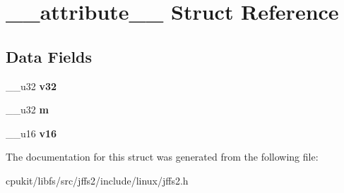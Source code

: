 \hypertarget{struct____attribute____}{}\section{\+\_\+\+\_\+attribute\+\_\+\+\_\+ Struct Reference}
\label{struct____attribute____}
\subsection*{Data Fields}
\begin{DoxyCompactItemize}
\item 
\mbox{\label{struct____attribute_____aa16138974292a9a7dde1b479491b8849}} 
\+\_\+\+\_\+u32 {\bfseries v32}
\item 
\mbox{\label{struct____attribute_____ac06e7f728282ddbf5ab29b5dbfe1bd6c}} 
\+\_\+\+\_\+u32 {\bfseries m}
\item 
\mbox{\label{struct____attribute_____ad5d9493c83088af524e21737aa3612f3}} 
\+\_\+\+\_\+u16 {\bfseries v16}
\end{DoxyCompactItemize}


The documentation for this struct was generated from the following file\+:\begin{DoxyCompactItemize}
\item 
cpukit/libfs/src/jffs2/include/linux/jffs2.\+h\end{DoxyCompactItemize}
